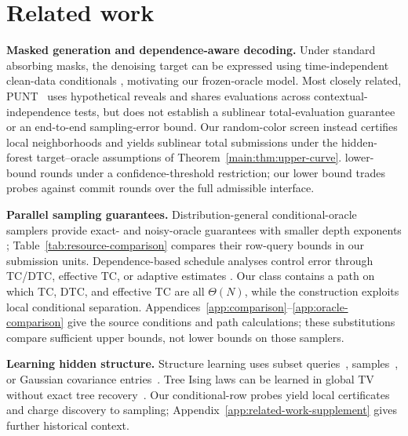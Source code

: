 \section{Related work}
\label{sec:related-work}

{\color{red}
\textbf{Masked generation and dependence-aware decoding.}
Under standard absorbing masks, the denoising target can be expressed using
time-independent clean-data conditionals
\citep{ou2024your,zheng2025timeagnostic}, motivating our frozen-oracle model.
Most closely related, PUNT~\mbox{\citep{azangulov2025parallel}} uses hypothetical
reveals and shares evaluations across contextual-independence tests, but does
not establish a sublinear total-evaluation guarantee or an end-to-end
sampling-error bound. Our random-color screen instead certifies local
neighborhoods and yields sublinear total submissions under the hidden-forest
target--oracle assumptions of Theorem~\ref{main:thm:upper-curve}.
 lower-bound rounds under a confidence-threshold restriction;
our lower bound trades probes against commit rounds over the full admissible
interface.

\textbf{Parallel sampling guarantees.}
Distribution-general conditional-oracle samplers provide exact- and
noisy-oracle guarantees with smaller depth exponents
\citep{anari2024parallel,anari2026autospeculation};
Table~\ref{tab:resource-comparison} compares their row-query bounds in our
submission units. Dependence-based schedule analyses control error through
TC/DTC, effective TC, or adaptive estimates
\citep{li2025convergence,chen2026optimal,dmitriev2026efficient,zhao2026adaptation}.
Our class contains a path on which TC, DTC, and effective TC are all
$\Theta(N)$, while the construction exploits local conditional separation.
Appendices~\ref{app:comparison}--\ref{app:oracle-comparison} give the source
conditions and path calculations; these substitutions compare sufficient
upper bounds, not lower bounds on those samplers.

\textbf{Learning hidden structure.}
Structure learning uses subset queries~\citep{angluin2008hidden,abasi2019edge},
samples~\citep{chowliu1968dependence,dasarathy2016active}, or Gaussian
covariance entries~\citep{lugosi2021covariancequeries}.
Tree Ising laws can be learned in global TV without exact tree
recovery~\citep{daskalakis2021treeising}.
Our conditional-row probes yield local certificates and charge discovery to
sampling; Appendix~\ref{app:related-work-supplement} gives further
historical context.
}
